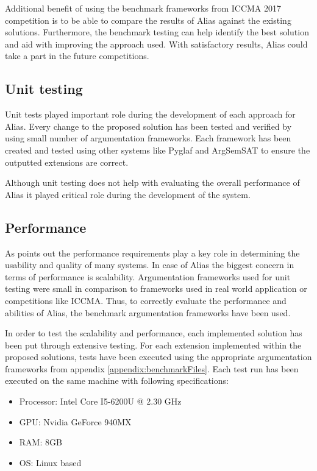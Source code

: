 Additional benefit of using the benchmark frameworks from ICCMA 2017 competition is to be able to compare the results of Alias against the existing solutions. Furthermore, the benchmark testing can help identify the best solution and aid with improving the approach used. With satisfactory results, Alias could take a part in the future competitions.

\subsection{Unit testing}
Unit tests played important role during the development of each approach for Alias. Every change to the proposed solution has been tested and verified by using small number of argumentation frameworks. Each framework has been created and tested using other systems like Pyglaf and ArgSemSAT to ensure the outputted extensions are correct. 

Although unit testing does not help with evaluating the overall performance of Alias it played critical role during the development of the system. 

\subsection{Performance}
As \citet{performanceTesting1} points out the performance requirements play a key role in determining the usability and quality of many systems. In case of Alias the biggest concern in terms of performance is scalability. Argumentation frameworks used for unit testing were small in comparison to frameworks used in real world application or competitions like ICCMA. Thus, to correctly evaluate the performance and abilities of Alias, the benchmark argumentation frameworks have been used.

In order to test the scalability and performance, each implemented solution has been put through extensive testing. For each extension implemented within the proposed solutions, tests have been executed using the appropriate argumentation frameworks from appendix \ref{appendix:benchmarkFiles}. Each test run has been executed on the same machine with following specifications:

\begin{itemize}
	\item Processor: Intel Core I5-6200U @ 2.30 GHz
	\item GPU: Nvidia GeForce 940MX
	\item RAM: 8GB
	\item OS: Linux based
\end{itemize}

